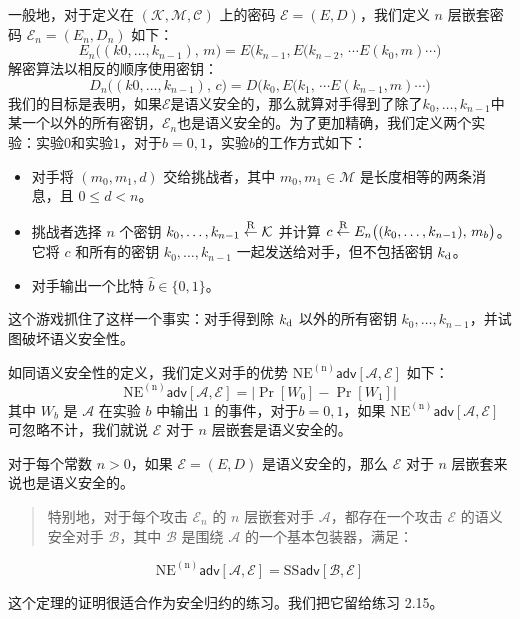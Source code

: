 一般地，对于定义在 $(\mathcal{K},\mathcal{M},\mathcal{C})$ 上的密码 $\mathcal{E}=(E,D)$，我们定义 $n$ 层嵌套密码 $\mathcal{E}_n=(E_n,D_n)$ 如下：
\[
E_n\big((k0,\dots,k_{n-1}),\,m\big)=E\big(k_{n-1},E(k_{n-2},\,\cdots E(k_0,m)\cdots\big)
\]
解密算法以相反的顺序使用密钥：
\[
D_n\big((k0,\dots,k_{n-1}),\,c\big)=D\big(k_0,E(k_1,\,\cdots E(k_{n-1},m)\cdots\big)
\]
我们的目标是表明，如果$\mathcal{E}$是语义安全的，那么就算对手得到了除了$k_0,\dots,k_{n-1}$中某一个以外的所有密钥，$\mathcal{E}_n$也是语义安全的。为了更加精确，我们定义两个实验：实验$0$和实验$1$，对于$b=0,1$，实验$b$的工作方式如下：
\begin{itemize}
	\item 对手将 $(m_0,m_1,d)$ 交给挑战者，其中 $m_0,m_1\in\mathcal{M}$ 是长度相等的两条消息，且 $0\leq d<n$。
	\item 挑战者选择 $n$ 个密钥 $k_0,\dots,k_{n-1}\overset{\rm R}\leftarrow\mathcal{K}$ 并计算 $c\overset{\rm R}\leftarrow E_n\big((k_0,\dots,k_{n-1}),\,m_b\big)$。它将 $c$ 和所有的密钥 $k_0,\dots,k_{n-1}$ 一起发送给对手，但不包括密钥 $k_{\rm d}$。
	\item 对手输出一个比特 $\hat b\in\{0,1\}$。
\end{itemize}
这个游戏抓住了这样一个事实：对手得到除 $k_{\rm d}$ 以外的所有密钥 $k_0,\dots,k_{n-1}$，并试图破坏语义安全性。

如同语义安全性的定义，我们定义对手的优势 $\mathrm{NE^{(n)}}\mathsf{adv}[\mathcal{A},\mathcal{E}]$ 如下：
\[
\mathrm{NE^{(n)}}\mathsf{adv}[\mathcal{A},\mathcal{E}]=\big\vert\Pr[W_0]-\Pr[W_1]\big\vert
\]
其中 $W_b$ 是 $\mathcal{A}$ 在实验 $b$ 中输出 $1$ 的事件，对于$b=0,1$，如果 $\mathrm{NE^{(n)}}\mathsf{adv}[\mathcal{A},\mathcal{E}]$ 可忽略不计，我们就说 $\mathcal{E}$ 对于 $n$ 层嵌套是语义安全的。

\begin{theorem}
对于每个常数 $n>0$，如果 $\mathcal{E}=(E,D)$ 是语义安全的，那么 $\mathcal{E}$ 对于 $n$ 层嵌套来说也是语义安全的。
\begin{quote}
特别地，对于每个攻击 $\mathcal{E}_n$ 的 $n$ 层嵌套对手 $\mathcal{A}$，都存在一个攻击 $\mathcal{E}$ 的语义安全对手 $\mathcal{B}$，其中 $\mathcal{B}$ 是围绕 $\mathcal{A}$ 的一个基本包装器，满足：
\end{quote}
\[
\mathrm{NE^{(n)}}\mathsf{adv}[\mathcal{A},\mathcal{E}]=\mathrm{SS}\mathsf{adv}[\mathcal{B},\mathcal{E}]
\]
\end{theorem}

\noindent
这个定理的证明很适合作为安全归约的练习。我们把它留给练习 2.15。
